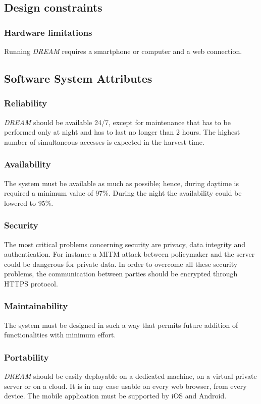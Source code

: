 \subsection{Design constraints}
\subsubsection{Hardware limitations}
Running \emph{DREAM} requires a smartphone or computer and a web connection.

\subsection{Software System Attributes}
\subsubsection{Reliability}
\emph{DREAM} should be available 24/7, except for maintenance that has to be performed
only at night and has to last no longer than 2 hours.
\newline The highest number of simultaneous accesses is expected in the harvest time.

\subsubsection{Availability}
The system must be available as much as possible; hence, during daytime is required a minimum value of 97\%.
During the night the availability could be lowered to 95\%.

\subsubsection{Security}
The most critical problems concerning security are privacy, data integrity and authentication. For instance a
MITM attack between policymaker and the server could be dangerous for private data. In order to overcome all
these security problems, the communication between parties should be encrypted through HTTPS protocol.

\subsubsection{Maintainability}
The system must be designed in such a way that permits future addition of functionalities with minimum effort.

\subsubsection{Portability}
\emph{DREAM} should be easily deployable on a dedicated machine, on a virtual private server or on a cloud.
It is in any case usable on every web browser, from every device. The mobile application must be supported by iOS
and Android.